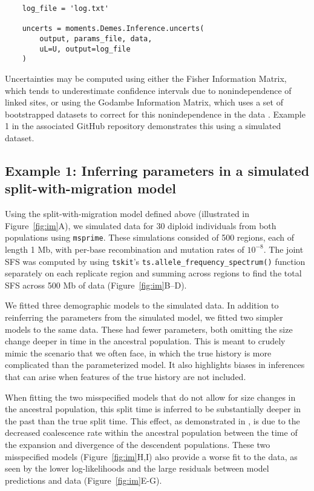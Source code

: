 \documentclass[]{article}
\newcommand{\msprime}{\texttt{msprime}\xspace}
\newcommand{\tskit}{\texttt{tskit}\xspace}
\begin{document}
\singlespacing
\begin{verbatim}
    log_file = 'log.txt'

    uncerts = moments.Demes.Inference.uncerts(
        output, params_file, data,
        uL=U, output=log_file
    )
\end{verbatim}
\doublespacing

Uncertainties may be computed using either the Fisher Information Matrix, which
tends to underestimate confidence intervals due to nonindependence of linked
sites, or using the Godambe Information Matrix, which uses a set of
bootstrapped datasets to correct for this nonindependence in the data
\cite{coffman2016computationally}. Example 1 in the associated GitHub
repository demonstrates this using a simulated dataset.

\subsection*{Example 1: Inferring parameters in a simulated
split-with-migration model}

Using the split-with-migration model defined above (illustrated in
Figure~\ref{fig:im}A), we simulated data for 30 diploid individuals from both
populations using \msprime \cite{baumdicker2022efficient}. These simulations
consided of 500 regions, each of length 1 Mb, with per-base recombination and
mutation rates of $10^{-8}$. The joint SFS was computed by using \tskit's
\texttt{ts.allele\_frequency\_spectrum()} function separately on each replicate
region and summing across regions to find the total SFS across 500 Mb of data
(Figure~\ref{fig:im}B--D).

We fitted three demographic models to the simulated data. In addition to
reinferring the parameters from the simulated model, we fitted two simpler 
models to the same data. These had fewer parameters, both omitting the size 
change deeper in time in the ancestral population. This is meant to crudely 
mimic the scenario that we often face, in which the true history is more 
complicated than the parameterized model. It also highlights biases in 
inferences that can arise when features of the true history are not included.

When fitting the two misspecified models that do not allow for size changes in
the ancestral population, this split time is inferred to be substantially
deeper in the past than the true split time. This effect, as demonstrated in
\cite{momigliano2021biases}, is due to the decreased coalescence rate within
the ancestral population between the time of the expansion and divergence of
the descendent populations. These two misspecified models
(Figure~\ref{fig:im}H,I) also provide a worse fit to the data, as seen by the
lower log-likelihoods and the large residuals between model predictions and
data (Figure~\ref{fig:im}E-G).
\end{document}
